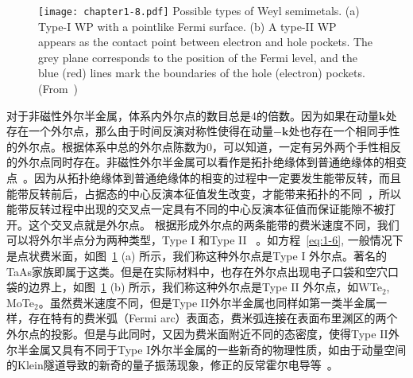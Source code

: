 \begin{figure}[!htbp]
    \centering
    \texttt{[image: chapter1-8.pdf]}
    { Possible types of Weyl semimetals. (a) Type-I WP with a pointlike Fermi surface. (b) A type-II WP appears as the contact point between electron and hole pockets. The grey plane corresponds to the position of
    the Fermi level, and the blue (red) lines mark the boundaries of the hole
    (electron) pockets.(From~\citep{soluyanov2015type})}
    \label{fig:1-8}
\end{figure}

对于非磁性外尔半金属，体系内外尔点的数目总是4的倍数。因为如果在动量$\mathbf{k}$处存在一个外尔点，那么由于时间反演对称性使得在动量$-\mathbf{k}$处也存在一个相同手性的外尔点。根据体系中总的外尔点陈数为0，可以知道，一定有另外两个手性相反的外尔点同时存在。非磁性外尔半金属可以看作是拓扑绝缘体到普通绝缘体的相变点~\citep{Murakami_2007,Murakami2}。因为从拓扑绝缘体到普通绝缘体的相变的过程中一定要发生能带反转，而且能带反转前后，占据态的中心反演本征值发生改变，才能带来拓扑的不同~\citep{Fu2007IS}，所以能带反转过程中出现的交叉点一定具有不同的中心反演本征值而保证能隙不被打开。这个交叉点就是外尔点。
根据形成外尔点的两条能带的费米速度不同，我们可以将外尔半点分为两种类型，Type I 和Type II~\citep{soluyanov2015type} 。如方程~\ref{eq:1-6}, 一般情况下是点状费米面，如图~\ref{fig:1-8} (a) 所示，我们称这种外尔点是Type I 外尔点。著名的TaAs家族即属于这类。但是在实际材料中，也存在外尔点出现电子口袋和空穴口袋的边界上，如图~\ref{fig:1-8} (b) 所示，我们称这种外尔点是Type II 外尔点，如WTe$_2$, MoTe$_2$。虽然费米速度不同，但是Type II外尔半金属也同样如第一类半金属一样，存在特有的费米弧（Fermi arc）表面态，费米弧连接在表面布里渊区的两个外尔点的投影。但是与此同时，又因为费米面附近不同的态密度，使得Type II外尔半金属又具有不同于Type I外尔半金属的一些新奇的物理性质，如由于动量空间的Klein隧道导致的新奇的量子振荡现象，修正的反常霍尔电导等~\citep{soluyanov2015type,Brien2016}。

